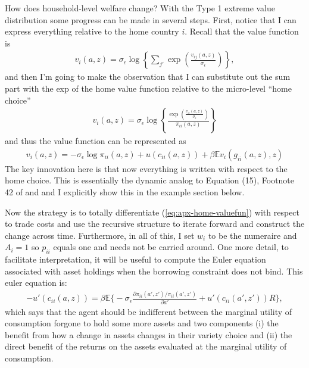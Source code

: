 \documentclass[12pt,pdftex]{article}
\begin{document}
\begin{onehalfspacing}
How does household-level welfare change? With the Type 1 extreme value distribution some progress can be made in several steps. First, notice that I can  express everything relative to the home country $i$. Recall that the value function is
\begin{align}
v_i(a, z) =  \sigma_{\epsilon} \log \left\{ \sum_{j'} \exp \left( \frac{  v_{ij}(a, z)}{\sigma_{\epsilon}} \right) \right\},
\end{align}
and then I'm going to make the observation that I can substitute out the sum part with the exp of the home value function relative to the micro-level ``home choice''
\begin{align}
v_i(a, z) =  \sigma_{\epsilon} \log \left\{ \frac{ \exp \left( \frac{  v_{ii}(a, z)}{\sigma_{\epsilon}}\right )}{\pi_{ii}(a,z)}  \right\}
\end{align}
and thus the value function can be represented as
\begin{align}
v_i(a, z) = -\sigma_{\epsilon} \log \pi_{ii}(a,z) + u(c_{ii}(a,z)) + \beta \mathbb{E} v_{i}(g_{ii}(a,z),z)
\label{eq:apx-home-valuefun}
\end{align}
The key innovation here is that now everything is written with respect to the home choice. This is essentially the dynamic analog to Equation (15), Footnote 42 of \citet{eaton2002technology} and \citet{arkolakis2012new} and I explicitly show this in the example section below.

Now the strategy is to totally differentiate (\ref{eq:apx-home-valuefun}) with respect to trade costs and use the recursive structure to iterate forward and construct the change across time. Furthermore, in all of this, I set $w_i$ to be the numeraire and $A_i = 1$ so $p_{ii}$ equals one and needs not be carried around. One more detail, to facilitate interpretation, it will be useful to compute the Euler equation associated with asset holdings when the borrowing constraint does not bind. This euler equation is:
\begin{align}
-u'(c_{ii}(a,z)) = \beta \mathbb{E} \bigg \{ -\sigma_{\epsilon} \frac{\partial \pi_{ii}(a',z') / \pi_{ii}(a',z')}{\partial a'} + u'(c_{ii}(a',z'))R \bigg \},
\end{align}
which says that the agent should be indifferent between the marginal utility of consumption forgone to hold some more assets and two components (i) the benefit from how a change in assets changes in their variety choice and (ii) the direct benefit of the returns on the assets evaluated at the marginal utility of consumption.


\end{onehalfspacing}
\end{document}
